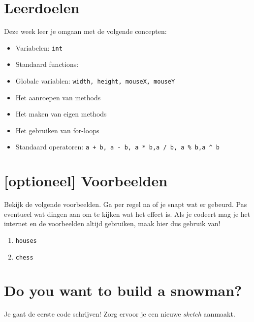 \newcommand{\tttt}{Recursie}
\newcommand{\dddd}{Datum 1}



\section{Leerdoelen}
Deze week leer je omgaan met de volgende concepten:
\begin{itemize}
    \item Variabelen: \texttt{int}
    \item Standaard functions: 
	\item Globale variablen: \texttt{width, height, mouseX, mouseY}     
    \item Het aanroepen van methods
    \item Het maken van eigen methods
    \item Het gebruiken van for-loops
    \item Standaard operatoren: \texttt{a + b, a - b, a * b,a / b, a \% b,a \textasciicircum{} b}
\end{itemize}

\section{[optioneel] Voorbeelden}
Bekijk de volgende voorbeelden. Ga per regel na of je snapt wat er gebeurd. Pas eventueel wat dingen aan om te kijken wat het effect is. Als je codeert mag je het internet en de voorbeelden altijd gebruiken, maak hier dus gebruik van!
\begin{enumerate}
	\item \texttt{houses}
	\item \texttt{chess}
\end{enumerate}

\section{Do you want to build a snowman?}
Je gaat de eerste code schrijven! Zorg ervoor je een nieuwe \textit{sketch} aanmaakt.
